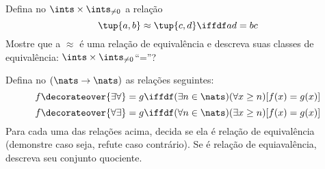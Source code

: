 \begin{exercise}
    Defina no $\ints \times \ints_{\neq 0}$ a relação
    $$
    \tup{a, b} \approx \tup{c, d} \iffdf ad = bc
    $$
    Mostre que a $\approx$ é uma relação de equivalência e descreva suas classes
    de equivalência: $\ints \times \ints_{\neq 0}$``=''?
\end{exercise}

\begin{exercise}
    Defina no $(\nats \to \nats)$ as relações seguintes:
    $$
    f \decorateover{\exists \forall}= g \iffdf (\exists n \in \nats)(\forall x
    \geq n)[f(x) = g(x)]
    $$
    $$
    f \decorateover{\forall \exists}= g \iffdf (\forall n \in \nats)(\exists x
    \geq n)[f(x) = g(x)]
    $$
    Para cada uma das relações acima, decida se ela é relação de equivalência
    (demonstre caso seja, refute caso contrário). Se é relação de equiavalência,
    descreva seu conjunto quociente.
\end{exercise}
